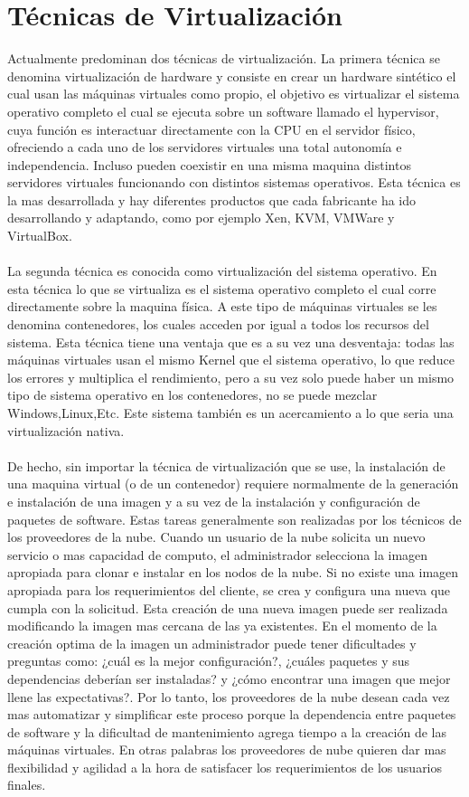 \section{Técnicas de Virtualización}
Actualmente predominan dos técnicas de virtualización. La primera técnica se denomina virtualización de hardware y consiste en crear un hardware sintético el cual usan las máquinas virtuales como propio, el objetivo es virtualizar el sistema operativo completo el cual se ejecuta sobre un software llamado el hypervisor, cuya función es interactuar directamente con la CPU en el servidor físico, ofreciendo a cada uno de los servidores virtuales una total autonomía e independencia. Incluso pueden coexistir en una misma maquina distintos servidores virtuales funcionando con distintos sistemas operativos. Esta técnica es la mas desarrollada y hay diferentes productos que cada fabricante ha ido desarrollando y adaptando, como por ejemplo Xen, KVM, VMWare y VirtualBox.\\
\\
La segunda técnica es conocida como virtualización del sistema operativo. En esta técnica lo que se virtualiza es el sistema operativo completo el cual corre directamente sobre la maquina física. A este tipo de máquinas virtuales se les denomina contenedores, los cuales acceden por igual a todos los recursos del sistema. Esta técnica tiene una ventaja que es a su vez una desventaja: todas las máquinas virtuales usan el mismo Kernel que el sistema operativo, lo que reduce los errores y multiplica el rendimiento, pero a su vez solo puede haber un mismo tipo de sistema operativo en los contenedores, no se puede mezclar Windows,Linux,Etc. Este sistema también es un acercamiento a lo que seria una virtualización nativa.\\
\\
De hecho, sin importar la técnica de virtualización que se use, la instalación de una maquina virtual (o de un contenedor) requiere normalmente de la generación e instalación de una imagen y a su vez de la instalación y configuración de paquetes de software. Estas tareas generalmente son realizadas por los técnicos de los proveedores de la nube. Cuando un usuario de la nube solicita un nuevo servicio o mas capacidad de computo, el administrador selecciona la imagen apropiada para clonar e instalar en los nodos de la nube. Si no existe una imagen apropiada para los requerimientos del cliente, se crea y configura una nueva que cumpla con la solicitud. Esta creación de una nueva imagen puede ser realizada modificando la imagen mas cercana de las ya existentes. En el momento de la creación optima de la imagen un administrador puede tener dificultades y preguntas como: ¿cuál es la mejor configuración?, ¿cuáles paquetes y sus dependencias deberían ser instaladas? y ¿cómo encontrar una imagen que mejor llene las expectativas?. Por lo tanto, los proveedores de la nube desean cada vez mas automatizar y simplificar este proceso porque la dependencia entre paquetes de software y la dificultad de mantenimiento agrega tiempo a la creación de las máquinas virtuales. En otras palabras los proveedores de nube quieren dar mas flexibilidad y agilidad a la hora de satisfacer los requerimientos de los usuarios finales.\\
\\

